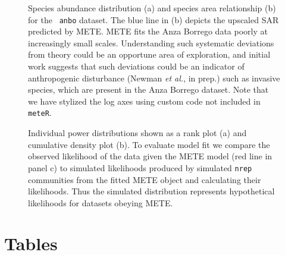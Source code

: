 \begin{figure}[H] 
\begin{center}
  \caption[Species abundance distribution and species area
  relationship for the \texttt{anbo} dataset]{Species abundance
    distribution (a) and species area relationship (b) for the \texttt{    anbo} dataset. The blue line in (b) depicts the upscaled SAR
    predicted by METE. METE fits the Anza Borrego data poorly at
    increasingly small scales. Understanding such systematic
    deviations from theory could be an opportune area of exploration,
    and initial work suggests that such deviations could be an
    indicator of anthropogenic disturbance (Newman \textit{et al.}, in
    prep.) such as invasive species, which are present in the Anza
    Borrego dataset. Note that we have stylized the log axes using
    custom code not included in \texttt{meteR}.}
\label{fig:anbo}
\end{center} 
\end{figure}


\begin{figure}[H] 
\begin{center}
\caption[Individual power distributions shown]{Individual power
  distributions shown as a rank plot (a) and cumulative density plot
  (b). To evaluate model fit we compare the observed likelihood of the
  data given the METE model (red line in panel c) to simulated
  likelihoods produced by simulated \texttt{nrep} communities from the
  fitted METE object and calculating their likelihoods. Thus the
  simulated distribution represents hypothetical likelihoods for
  datasets obeying METE.} 
\label{fig:arth} 
\end{center} 
\end{figure}

\section*{Tables}

